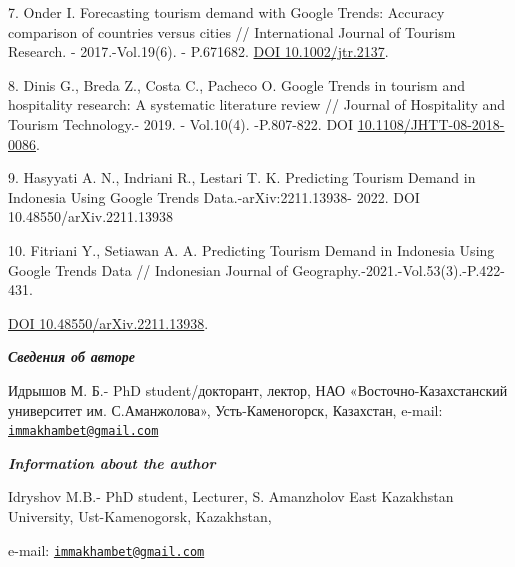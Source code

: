 7. Onder I. Forecasting tourism demand with Google Trends: Accuracy
comparison of countries versus cities // International Journal of
Tourism Research. - 2017.-Vol.19(6). - P.671682.
\href{https://doi.org/10.1002/jtr.2137}{DOI 10.1002/jtr.2137}.

8. Dinis G., Breda Z., Costa C., Pacheco O. Google Trends in tourism and
hospitality research: A systematic literature review // Journal of
Hospitality and Tourism Technology.- 2019. - Vol.10(4). -P.807-822.
DOI
\href{http://dx.doi.org/10.1108/JHTT-08-2018-0086}{10.1108/JHTT-08-2018-0086}.

9. Hasyyati A. N., Indriani R., Lestari T. K. Predicting Tourism Demand
in Indonesia Using Google Trends Data.-arXiv:2211.13938- 2022. DOI
10.48550/arXiv.2211.13938

10. Fitriani Y., Setiawan A. A. Predicting Tourism Demand in Indonesia
Using Google Trends Data // Indonesian Journal of
Geography.-2021.-Vol.53(3).-P.422-431.

\href{https://doi.org/10.48550/arXiv.2211.13938}{DOI
10.48550/arXiv.2211.13938}.

\emph{{\bfseries Сведения об авторе}}

Идрышов М. Б.- PhD student/докторант, лектор, НАО
«Восточно-Казахстанский университет им. С.Аманжолова», Усть-Каменогорск,
Казахстан, e-mail:
\href{mailto:immakhambet@gmail.com}{\nolinkurl{immakhambet@gmail.com}}

\emph{{\bfseries Information about the author}}

Idryshov M.B.- PhD student, Lecturer, S. Amanzholov East Kazakhstan
University, Ust-Kamenogorsk, Kazakhstan,

e-mail:
\href{mailto:immakhambet@gmail.com}{\nolinkurl{immakhambet@gmail.com}}\